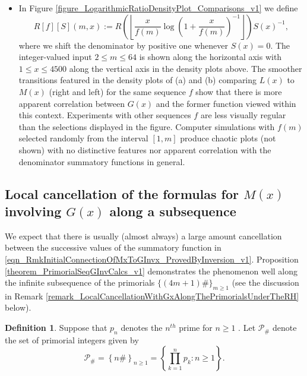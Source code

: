 \documentclass[11pt,reqno,a4letter]{article}
\newcommand{\hlocalref}[1]{\hyperref[#1]{\ref{#1}}}
\numberwithin{equation}{section}
\numberwithin{figure}{section}
\numberwithin{table}{section}
\newcommand{\floor}[1]{\left\lfloor #1 \right\rfloor}
\newcommand{\seqnum}[1]{\href{http://oeis.org/#1}{\color{ProcessBlue}{\underline{#1}}}}
\theoremstyle{plain}
\numberwithin{theorem}{section}
\theoremstyle{definition}
\newtheorem{definition}[theorem]{Definition}
\begin{document}
\begin{itemize}[noitemsep,topsep=0pt,leftmargin=0.23in]
\item In Figure \hlocalref{figure_LogarithmicRatioDensityPlot_Comparisons_v1} we define 
      \[
      R[f][S](m, x) := R\left(\floor{\frac{x}{f(m)} \log\left(1 + \frac{x}{f(m)}\right)^{-1}}\right) S(x)^{-1}, 
      \]
      where we shift the denominator by positive one whenever $S(x) = 0$. 
      The integer-valued input $2 \leq m \leq 64$ is shown along the horizontal axis with $1 \leq x \leq 4500$ along the 
      vertical axis in the density plots above. 
      The smoother transitions featured in the density plots of (a) and  (b) 
      comparing $L(x)$ to $M(x)$ (right and left) for the same sequence $f$ 
      show that there is more apparent correlation between $G(x)$ and the former function viewed within this context. 
      Experiments with other sequences $f$ are less visually regular than the selections displayed in the figure. 
      Computer simulations with $f(m)$ selected randomly from the interval $[1, m]$ 
      produce chaotic plots (not shown) with no distinctive features nor apparent correlation with the 
      denominator summatory functions in general.

\end{itemize}

\subsection{Local cancellation of 
	    the formulas for $M(x)$ involving $G(x)$ along a subsequence} 
\label{subSection_LocalCancellationOfGInvx} 

We expect that there is usually (almost always) 
a large amount cancellation between the successive 
values of the summatory function in 
\eqref{eqn_RmkInitialConnectionOfMxToGInvx_ProvedByInversion_v1}. 
Proposition \hlocalref{theorem_PrimorialSeqGInvCalcs_v1} 
demonstrates the phenomenon well along the infinite 
subsequence of the primorials $\{(4m+1)\#\}_{m \geq 1}$ 
(see the discussion in 
Remark \hlocalref{remark_LocalCancellationWithGxAlongThePrimorialsUnderTheRH} below).

\begin{definition}
Suppose that $p_n$ denotes the $n^{th}$ prime for $n \geq 1$ 
\cite[\seqnum{A000040}]{OEIS}. 
Let $\mathcal{P}_{\#}$ denote the set of primorial integers given by  
\cite[\seqnum{A002110}]{OEIS} 
\[
\mathcal{P}_{\#} = \left\{n\#\right\}_{n \geq 1} = \left\{\prod_{k=1}^{n} p_k : n \geq 1\right\}. 
\]
\end{definition}
\end{document}
